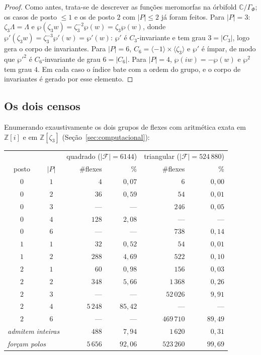 \documentclass[11pt,a4paper]{article}
\theoremstyle{plain}
\theoremstyle{definition}
\theoremstyle{remark}
\newcommand{\C}{\mathbb{C}}
\newcommand{\Z}{\mathbb{Z}}
\newcommand{\Zi}{\Z[i]}
\newcommand{\FF}{\mathscr{F}}
\begin{document}
\begin{proof}
Como antes, trata-se de descrever as funções meromorfas na órbifold
$\C/\Gamma_\Phi$; os casos de posto $\le1$ e os de posto $2$ com $|P|\le2$ já
foram feitos. Para $|P|=3$: $\zeta_3\Lambda=\Lambda$ e
$\wp(\zeta_3w)=\zeta_3^{-2}\wp(w)=\zeta_3\wp(w)$, donde
$\wp'(\zeta_3w)=\zeta_3^{-3}\wp'(w)=\wp'(w)$: $\wp'$ é $C_3$-invariante e tem
grau $3=|C_3|$, logo gera o corpo de invariantes. Para $|P|=6$, $C_6=\langle
-1\rangle\times\langle\zeta_3\rangle$ e $\wp'$ é ímpar, de modo que $\wp'^2$ é
$C_6$-invariante de grau $6=|C_6|$. Para $|P|=4$, $\wp(iw)=-\wp(w)$ e $\wp^2$
tem grau $4$. Em cada caso o índice bate com a ordem do grupo, e o corpo de
invariantes é gerado por esse elemento.
\end{proof}

\subsection*{Os dois censos}
Enumerando exaustivamente os dois grupos de flexes com aritmética exata em
$\Zi$ e em $\Z[\zeta_3]$ (Seção~\ref{sec:computacional}):
\begin{center}
\renewcommand{\arraystretch}{1.15}
\begin{tabular}{ccrrrr}
\toprule
& & \multicolumn{2}{c}{quadrado ($|\FF|=6144$)} & \multicolumn{2}{c}{triangular ($|\FF|=524\,880$)}\\
posto & $|P|$ & \#flexes & \% & \#flexes & \%\\
\midrule
$0$&$1$&    $4$&$0{,}07$&      $6$&$0{,}00$\\
$0$&$2$&   $36$&$0{,}59$&     $54$&$0{,}01$\\
$0$&$3$&    ---&---&         $246$&$0{,}05$\\
$0$&$4$&  $128$&$2{,}08$&      ---&---\\
$0$&$6$&    ---&---&         $738$&$0{,}14$\\
$1$&$1$&   $32$&$0{,}52$&     $54$&$0{,}01$\\
$1$&$2$&  $288$&$4{,}69$&    $522$&$0{,}10$\\
$2$&$1$&   $60$&$0{,}98$&    $156$&$0{,}03$\\
$2$&$2$&  $348$&$5{,}66$&  $1\,368$&$0{,}26$\\
$2$&$3$&    ---&---&      $52\,026$&$9{,}91$\\
$2$&$4$&$5\,248$&$85{,}42$&    ---&---\\
$2$&$6$&    ---&---&     $469\,710$&$89{,}49$\\
\midrule
\multicolumn{2}{l}{\emph{admitem inteiras}} & $488$ & $7{,}94$ & $1\,620$ & $0{,}31$\\
\multicolumn{2}{l}{\emph{forçam polos}} & $5\,656$ & $92{,}06$ & $523\,260$ & $99{,}69$\\
\bottomrule
\end{tabular}
\end{center}
\end{document}
